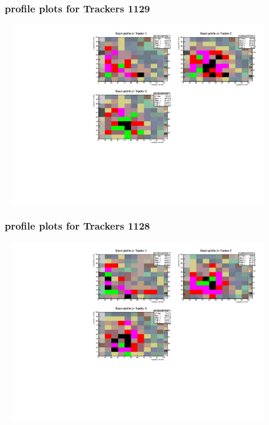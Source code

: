 \documentclass[slidestop,compress,mathserif]{beamer}
\begin{document}
\begin{frame}\frametitle{profile plots for Trackers 1129}
	 \includegraphics[width=12cm,height=8cm]{profile_plots_for_Trackers_1129.pdf}
\end{frame}
\begin{frame}\frametitle{profile plots for Trackers 1128}
	 \includegraphics[width=12cm,height=8cm]{profile_plots_for_Trackers_1128.pdf}
\end{frame}
\end{document}
